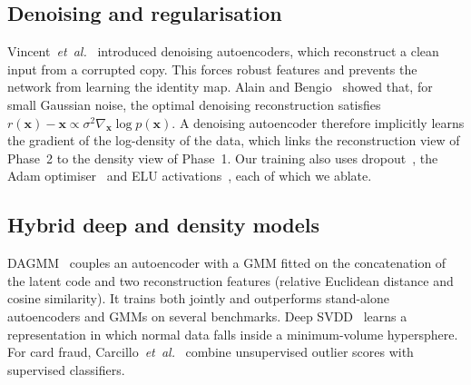 \documentclass[12pt]{article}
\begin{document}
\subsection{Denoising and regularisation}
Vincent~\emph{et~al.}~\cite{vincent2008,vincent2010} introduced denoising autoencoders, which reconstruct a clean
input from a corrupted copy. This forces robust features and prevents the network from learning the identity map.
Alain and Bengio~\cite{alain2014} showed that, for small Gaussian noise, the optimal denoising reconstruction satisfies
$r(\mathbf{x})-\mathbf{x}\propto\sigma^2\nabla_{\mathbf{x}}\log p(\mathbf{x})$. A denoising autoencoder therefore
implicitly learns the gradient of the log-density of the data, which links the reconstruction view of Phase~2 to the
density view of Phase~1. Our training also uses dropout~\cite{srivastava2014}, the Adam optimiser~\cite{kingma2015} and
ELU activations~\cite{clevert2016}, each of which we ablate.

\subsection{Hybrid deep and density models}
DAGMM~\cite{zong2018} couples an autoencoder with a GMM fitted on the concatenation of the latent code and two
reconstruction features (relative Euclidean distance and cosine similarity). It trains both jointly and outperforms
stand-alone autoencoders and GMMs on several benchmarks. Deep SVDD~\cite{ruff2018} learns a representation in which
normal data falls inside a minimum-volume hypersphere. For card fraud, Carcillo~\emph{et~al.}~\cite{carcillo2021} combine
unsupervised outlier scores with supervised classifiers.
\end{document}
